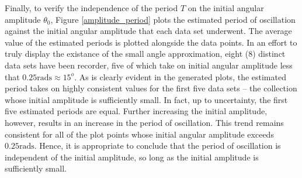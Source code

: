 Finally, to verify the independence of the period $T$ on the initial angular amplitude 
$\theta_0$, Figure \ref{amplitude_period} plots the estimated period of oscillation 
against the initial angular amplitude that each data set underwent. The average value of 
the estimated periods is plotted alongside the data points. In an effort to truly display 
the existance of the small angle approximation, eight (8) distinct data sets have been 
recorder, five of which take on initial angular amplitude less that $0.25\text{rads} \approx 15^o$. 
As is clearly evident in the generated plots, the estimated period takes on highly consistent 
values for the first five data sets -- the collection whose initial amplitude is sufficiently 
small. In fact, up to uncertainty, the first five estimated periods are equal. Further increasing 
the initial amplitude, however, results in an increase in the period of oscillation. This trend 
remains consistent for all of the plot points whose initial angular amplitude exceeds $0.25\text{rads}$. 
Hence, it is appropriate to conclude that the period of oscillation is independent of the initial 
amplitude, so long as the initial amplitude is sufficiently small.

